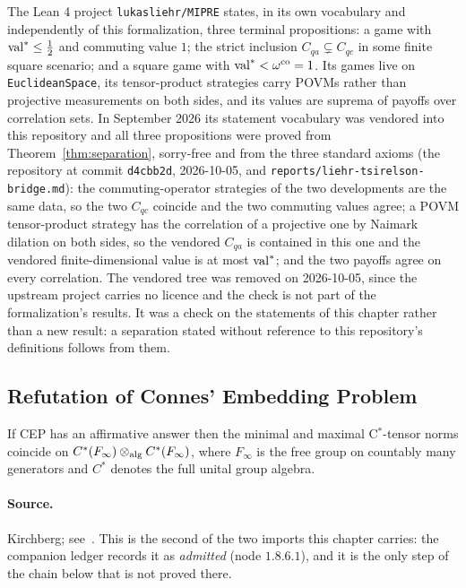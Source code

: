 \begin{remark}
\label{rem:liehr-statements}
The Lean 4 project \texttt{lukasliehr/MIPRE} states, in its own vocabulary and independently
of this formalization, three terminal propositions: a game with $\mathrm{val}^* \leq \frac12$ and
commuting value $1$; the strict inclusion $C_{qa} \subsetneq C_{qc}$ in some finite square
scenario; and a square game with $\mathrm{val}^* < \omega^{\mathrm{co}} = 1$. Its games live on
\texttt{EuclideanSpace}, its tensor-product strategies carry POVMs rather than projective
measurements on both sides, and its values are suprema of payoffs over correlation sets. In
September 2026 its statement vocabulary was vendored into this repository and all three
propositions were proved from Theorem~\ref{thm:separation}, sorry-free and from the three
standard axioms (the repository at commit \texttt{d4cbb2d}, 2026-10-05, and
\texttt{reports/liehr-tsirelson-bridge.md}): the commuting-operator strategies of the two
developments are the same data, so the two $C_{qc}$ coincide and the two commuting values
agree; a POVM tensor-product strategy has the correlation of a projective one by Naimark
dilation on both sides, so the vendored $C_{qa}$ is contained in this one and the vendored
finite-dimensional value is at most $\mathrm{val}^*$; and the two payoffs agree on every
correlation. The vendored tree was removed on 2026-10-05, since the upstream project carries
no licence and the check is not part of the formalization's results. It was a check on the
statements of this chapter rather than a new result: a separation stated without reference
to this repository's definitions follows from them.
\end{remark}

\subsection{Refutation of Connes' Embedding Problem}

\effortHard

\begin{lemma}
\label{lem:kirchberg-forward}
If CEP has an affirmative answer then the minimal and maximal C$^*$-tensor norms coincide on
$C^*(F_\infty) \otimes_{\mathrm{alg}} C^*(F_\infty)$, where $F_\infty$ is the free group on
countably many generators and $C^*$ denotes the full unital group algebra.
\end{lemma}

\paragraph{Source.} Kirchberg; see~\cite{Oza13}. This is the second of the two imports this
chapter carries: the companion ledger records it as \emph{admitted} (node $1.8.6.1$), and it is
the only step of the chain below that is not proved there.

